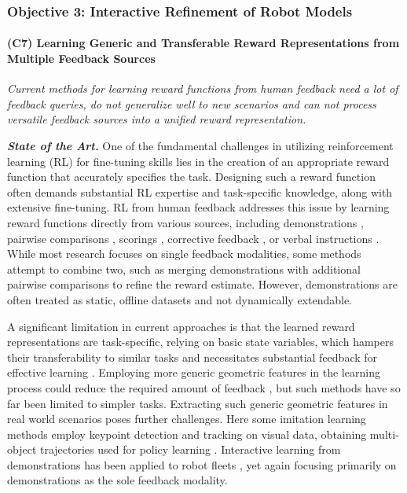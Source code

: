 \documentclass{erc-B2}
\begin{document}
\subsubsection{Objective 3: Interactive Refinement of Robot Models}

\paragraph{(C7) Learning Generic and Transferable Reward Representations from Multiple Feedback Sources}
\textit{Current methods for learning reward functions from human feedback need a lot of feedback queries, do not generalize well to new scenarios and can not process versatile feedback sources into a unified reward representation.}

\textit{\textbf{State of the Art.}}
One of the fundamental challenges in utilizing reinforcement learning (RL) for fine-tuning skills lies in the creation of an appropriate reward function that accurately specifies the task. Designing such a reward function often demands substantial RL expertise and task-specific knowledge, along with extensive fine-tuning. RL from human feedback addresses this issue by learning reward functions directly from various sources, including demonstrations \cite{Takayuki2018ImitationLearning}, pairwise comparisons \cite{wirth2016PrefRL,ChristianoNIPS2017}, scorings \cite{Garrett2018DeepTamer}, corrective feedback \cite{Losey2022PCorrections}, or verbal instructions \cite{Pratyusha2020CorrectingNLF}. While most research focuses on single feedback modalities, some methods attempt to combine two, such as merging demonstrations with additional pairwise comparisons to refine the reward estimate. However, demonstrations are often treated as static, offline datasets and not dynamically extendable. %

A significant limitation in current approaches is that the learned reward representations are task-specific, relying on basic state variables, which hampers their transferability to similar tasks and necessitates substantial feedback for effective learning \cite{brown2019drex, Biyik2018BatchPref}. Employing more generic geometric features in the learning process could reduce the required amount of feedback \cite{freymuth2022vigor}, but such methods have so far been limited to simpler tasks. Extracting such generic geometric features in real world scenarios poses further challenges. Here some imitation learning methods employ keypoint detection and tracking on visual data, obtaining multi-object trajectories used for policy learning \cite{Jianfeng2023KVIL}. Interactive learning from demonstrations has been applied to robot fleets \cite{datta2023iifl}, yet again focusing primarily on demonstrations as the sole feedback modality.
\end{document}
